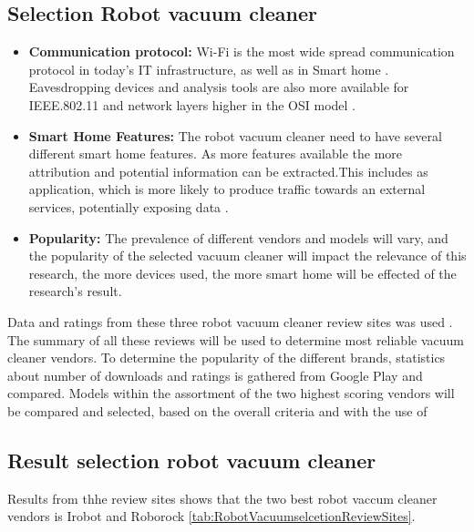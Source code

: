 \subsection{Selection Robot vacuum cleaner}
\begin{itemize}
    \item \textbf{Communication protocol:} Wi-Fi is the most wide spread communication protocol in today's IT infrastructure, as well as in Smart home \cite{robotsel1}. Eavesdropping devices and analysis tools are also more available for IEEE.802.11 and network layers higher in the OSI model \cite{osimodel}.
    
    \item \textbf{Smart Home Features:} The robot vacuum cleaner need to have several different smart home features. As more features available the more attribution and potential information can be extracted.This includes as application, which is more likely to produce traffic towards an external services, potentially exposing data \cite{robotsel4}.
    
    \item \textbf{Popularity:} The prevalence of different vendors and models will vary, and the popularity of the selected vacuum cleaner will impact the relevance of this research, the more devices used, the more smart home will be effected of the research's result. 
\end{itemize}

Data and ratings from these three robot vacuum cleaner review sites was used \cite{robotsel11}\cite{robotsel12}\cite{robotsel13}. The summary of all these reviews will be used to determine most reliable vacuum cleaner vendors. To determine the popularity of the different brands, statistics about number of downloads and ratings is gathered from Google Play \cite{GooglePlay} and compared.
Models within the assortment of the two highest scoring vendors will be compared and selected, based on the overall criteria and with the use of \cite{robotsel9}

\subsection{Result selection robot vacuum cleaner}

Results from thhe review sites shows that the two best robot vaccum cleaner vendors is Irobot and Roborock \ref{tab:RobotVacuumselcetionReviewSites}. 

